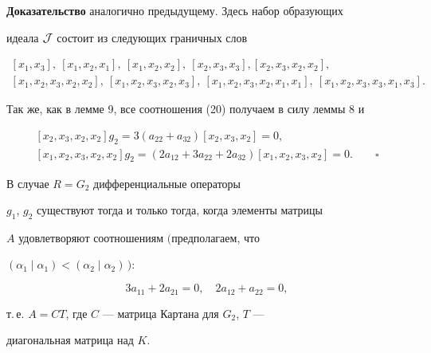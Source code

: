 {\bf Доказательство} аналогично предыдущему. Здесь набор образующих


идеала $\cal J$ состоит из следующих граничных слов


\begin{gather*}


[x_1,x_3],\ [x_1,x_2,x_1],\ [x_1,x_2,x_2],\ [x_2,x_3,x_3],


[x_2,x_3,x_2,x_2], \\


[x_1,x_2,x_3,x_2,x_2],\ [x_1,x_2,x_3,x_2,x_3],


\ [x_1,x_2,x_3,x_2,x_1,x_1],\ [x_1,x_2,x_3,x_3,x_1,x_3].


\end{gather*}


Так же, как в лемме 9, все соотношения (20) получаем в силу леммы 8 и


\begin{gather*}


[x_2,x_3,x_2,x_2]g_2=3(a_{22}+a_{32})[x_2,x_3,x_2]=0, \\


{[x_1,x_2,x_3,x_2,x_2]}g_2=(2a_{12}+3a_{22}+2a_{32})[x_1,x_2,x_3,x_2]=0.


\qquad\square


\end{gather*}





\begin{lem}


В случае $R=G_2$ дифференциальные операторы


$g_1$, $g_2$ существуют тогда и только тогда, когда элементы матрицы


$A$ удовлетворяют соотношениям $($предполагаем, что 


$(\alpha_1\mid \alpha_1)<(\alpha_2\mid \alpha_2)\,){:}$


\begin{equation}


3a_{11}+2a_{21}=0, \quad 2a_{12}+a_{22}=0,


\end{equation}


т.\,е. $A=CT$, где $C$ --- матрица Картана для $G_2$, $T$ ---


диагональная матрица над $K$.


\end{lem}





